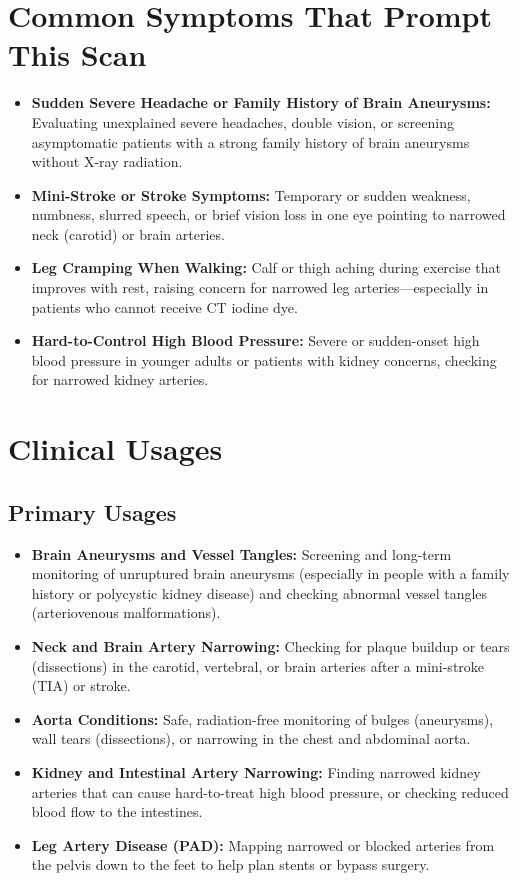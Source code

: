 \section{Common Symptoms That Prompt This Scan}
\begin{itemize}
\item \textbf{Sudden Severe Headache or Family History of Brain Aneurysms:} Evaluating unexplained severe headaches, double vision, or screening asymptomatic patients with a strong family history of brain aneurysms without X-ray radiation.
\item \textbf{Mini-Stroke or Stroke Symptoms:} Temporary or sudden weakness, numbness, slurred speech, or brief vision loss in one eye pointing to narrowed neck (carotid) or brain arteries.
\item \textbf{Leg Cramping When Walking:} Calf or thigh aching during exercise that improves with rest, raising concern for narrowed leg arteries---especially in patients who cannot receive CT iodine dye.
\item \textbf{Hard-to-Control High Blood Pressure:} Severe or sudden-onset high blood pressure in younger adults or patients with kidney concerns, checking for narrowed kidney arteries.
\end{itemize}

\section{Clinical Usages}

\subsection{Primary Usages}
\begin{itemize}
\item \textbf{Brain Aneurysms and Vessel Tangles:} Screening and long-term monitoring of unruptured brain aneurysms (especially in people with a family history or polycystic kidney disease) and checking abnormal vessel tangles (arteriovenous malformations).
\item \textbf{Neck and Brain Artery Narrowing:} Checking for plaque buildup or tears (dissections) in the carotid, vertebral, or brain arteries after a mini-stroke (TIA) or stroke.
\item \textbf{Aorta Conditions:} Safe, radiation-free monitoring of bulges (aneurysms), wall tears (dissections), or narrowing in the chest and abdominal aorta.
\item \textbf{Kidney and Intestinal Artery Narrowing:} Finding narrowed kidney arteries that can cause hard-to-treat high blood pressure, or checking reduced blood flow to the intestines.
\item \textbf{Leg Artery Disease (PAD):} Mapping narrowed or blocked arteries from the pelvis down to the feet to help plan stents or bypass surgery.
\end{itemize}

